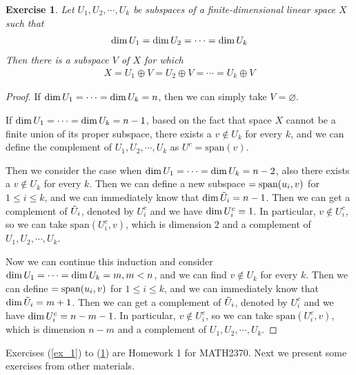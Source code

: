 \documentclass[11pt]{book}
\newtheorem{exercise}{Exercise}[section]
\theoremstyle{definition}
\numberwithin{equation}{subsection}
\begin{document}
\begin{exercise}\label{ex_5}
Let $U_1,U_2,\cdots,U_k$ be subspaces of a finite-dimensional linear space $X$ such that
\begin{align*}
    {\rm dim}\,U_1 = {\rm dim}\,U_2 = \cdots = {\rm dim}\,U_k
\end{align*}
Then there is a subspace $V$ of $X$ for which
\begin{align*}
    X = U_1\oplus V = U_2\oplus V = \cdots = U_k\oplus V
\end{align*}
\end{exercise}
\begin{proof}
If ${\rm dim}\, U_1 = \cdots = {\rm dim}\, U_k = n$, then we can simply take $V = \varnothing$.

If ${\rm dim}\, U_1 = \cdots = {\rm dim}\, U_k = n-1$, based on the fact that space $X$ cannot be a finite union of its proper subspace, there exists a $v \notin U_k$ for every $k$, and we can define the complement of $U_1, U_2, \cdots, U_k$ as $U^c = \text{span}(v)$.

Then we consider the case when ${\rm dim}\, U_1 = \cdots = {\rm dim}\, U_k = n-2$, also there exists a $v \notin U_k$ for every $k$. Then we can define a new subspace $\title{\Tilde{U}_i} = \text{span}(u_i,v)$ for $1 \leq i \leq k$, and we can immediately know that ${\rm dim}\, \Tilde{U}_i = n - 1$. Then we can get a complement of $\Tilde{U}_i$, denoted by $U_i^c$ and we have ${\rm dim}\, U_i^c = 1$. In particular, $v \notin U_i^c$, so we can take $\text{span} (U_i^c, v)$, which is dimension $2$ and a complement of $U_1, U_2, \cdots, U_k$.

Now we can continue this induction and consider ${\rm dim}\, U_1 = \cdots = {\rm dim}\, U_k = m, m < n$, and we can find $v \notin U_k$ for every $k$. Then we can define $\title{\Tilde{U}_i} = \text{span}(u_i,v)$ for $1 \leq i \leq k$, and we can immediately know that ${\rm dim}\, \Tilde{U}_i = m + 1$. Then we can get a complement of $\Tilde{U}_i$, denoted by $U_i^c$ and we have ${\rm dim}\, U_i^c = n - m - 1$. In particular, $v \notin U_i^c$, so we can take $\text{span} (U_i^c, v)$, which is dimension $n - m$ and a complement of $U_1, U_2, \cdots, U_k$.
\end{proof}
Exercises (\ref{ex_1}) to (\ref{ex_5}) are Homework 1 for MATH2370. Next we present some exercises from other materials.

\medskip
\end{document}
